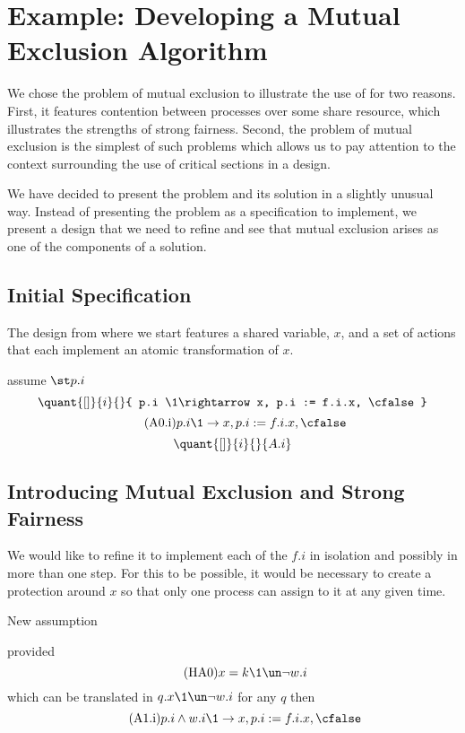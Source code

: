 \section{Example: Developing a Mutual Exclusion Algorithm}
\label{sec:example}

We chose the problem of mutual exclusion to illustrate the use of \unitb for two reasons.  First, it features contention between processes over some share resource, which illustrates the strengths of strong fairness.  Second, the problem of mutual exclusion is the simplest of such problems which allows us to pay attention to the context surrounding the use of critical sections in a design.

We have decided to present the problem and its solution in a slightly unusual way.  Instead of presenting the problem as a specification to implement, we present a design that we need to refine and see that mutual exclusion arises as one of the components of a solution.


\subsection{Initial Specification}

The design from where we start features a shared variable, $x$, and a set of actions that each implement an atomic transformation of $x$.

assume $\st p.i$
\[  \quant{ [] }{ i }{}{ p.i  \1\rightarrow x, p.i := f.i.x, \cfalse } \]
\[ \tag{A0.i} p.i  \1\rightarrow x, p.i := f.i.x, \cfalse \]
\[  \quant{ [] }{ i }{}{ A.i } \]

\subsection{Introducing Mutual Exclusion and Strong Fairness}

We would like to refine it to implement each of the $f.i$ in isolation and possibly in more than one step.  For this to be possible, it would be necessary to create a protection around $x$ so that only one process can assign to it at any given time.

New assumption 

provided
\[  \tag{HA0} x = k \1\un \neg w.i  \]
which can be translated in $  q.x \1\un \neg w.i  $
for any $q$
then
\[ \tag{A1.i}  p.i \land w.i  \1\rightarrow x, p.i := f.i.x, \cfalse \]

